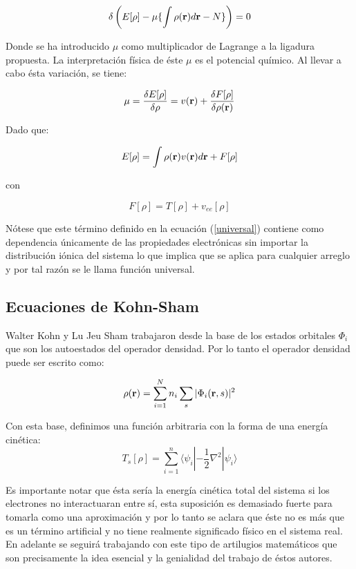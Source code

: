 \documentclass [11pt]{article}
\begin{document}
\begin{equation}\label{minimization}
	\delta\left(E[\rho]-\mu\{\int \rho({\bf r})d{\bf r}-N\}\right)=0
\end{equation}	

Donde se ha introducido $\mu$ como multiplicador de Lagrange a la ligadura propuesta. La interpretación física de éste $\mu$ es el potencial químico. Al llevar a cabo ésta variación, se tiene:

\begin{equation}
	\mu=\frac{\delta E[\rho]}{\delta \rho}=v({\bf r})+\frac{\delta F[\rho]}{\delta\rho({\bf r})}
\end{equation}

Dado que:

\begin{equation}
	E[\rho]=\int \rho({\bf r})v({\bf r})d{\bf r}+F[\rho]
\end{equation}

con

\begin{equation}\label{universal}
	F[\rho]=T[\rho]+v_{ee}[\rho]
\end{equation}

Nótese que este término definido en la ecuación (\ref{universal}) contiene como dependencia únicamente de las propiedades electrónicas sin importar la distribución iónica del sistema lo que implica que se aplica para cualquier arreglo y por tal razón se le llama función universal.

\subsection{Ecuaciones de Kohn-Sham}

Walter Kohn y Lu Jeu Sham trabajaron desde la base de los estados orbitales $\Phi_i$  que son los autoestados del operador densidad. Por lo tanto el operador densidad puede ser escrito como:

\begin{equation}
    \rho ({\bf r})=\sum_{i=1}^Nn_i\sum_s^{}|\Phi_i({\bf r}, s)|^2
\end{equation}

Con esta base, definimos una función arbitraria con la forma de una energía cinética:
\begin{equation}
	T_s[\rho]=\sum_{i=1}^n\langle\psi_i|-\frac{1}{2}\nabla^2|\psi_i\rangle
\end{equation}

Es importante notar que ésta sería la energía cinética total del sistema si los electrones no interactuaran entre sí, esta suposición es demasiado fuerte para tomarla como una aproximación y por lo tanto se aclara que éste no es más que  es un término artificial y no tiene realmente significado físico en el sistema real. En adelante se seguirá trabajando con este tipo de artilugios matemáticos que son precisamente la idea esencial y la genialidad del trabajo de éstos autores.
\end{document}
